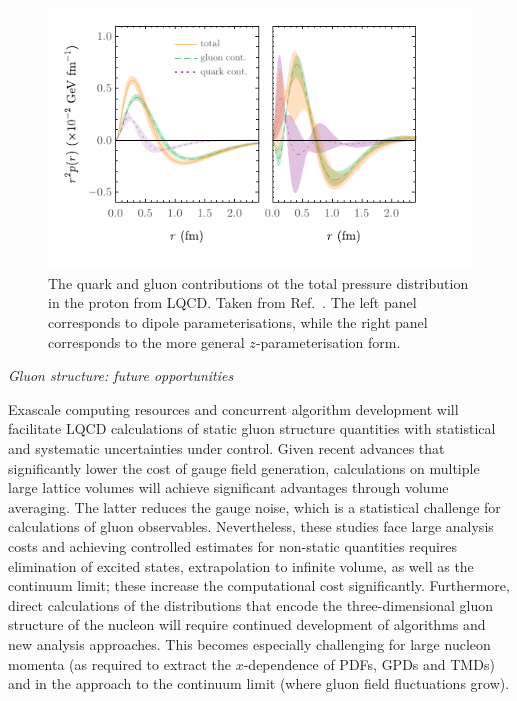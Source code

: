 \begin{figure}
	\centering
	\includegraphics[width=0.7\linewidth]{figures/combinedpressurelattnew.pdf}
	\caption{The quark and gluon contributions ot the total pressure distribution in the proton from LQCD. Taken from Ref.~\cite{Shanahan:2018pib}. The left panel corresponds to dipole parameterisations, while the right panel corresponds to the more general $z$-parameterisation form.}
	\label{gluefig}
\end{figure}






{\it Gluon structure: future opportunities}

Exascale computing resources and concurrent algorithm development will facilitate LQCD calculations of static gluon structure quantities with statistical and systematic uncertainties under control. Given recent advances that significantly lower the cost of gauge field generation, calculations on multiple large lattice volumes  will achieve significant advantages through volume averaging. The latter reduces the gauge noise, which is a statistical challenge for calculations of gluon observables. Nevertheless, these studies face large analysis costs and achieving controlled estimates for non-static quantities requires elimination of excited states, extrapolation to infinite volume, as well as the continuum limit; these increase the computational cost significantly. Furthermore, direct calculations of the distributions that encode the three-dimensional gluon structure of the nucleon will require continued development of algorithms and new analysis approaches.
This becomes especially challenging for large nucleon momenta (as required to extract the $x$-dependence of PDFs, GPDs and TMDs) and in the approach to the continuum limit (where gluon field fluctuations grow). \\


